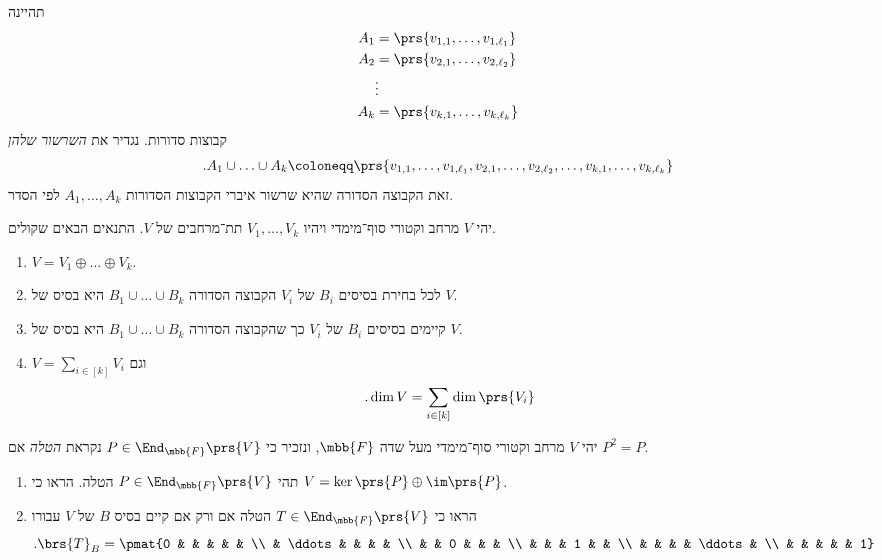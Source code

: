 \documentclass[a4paper,10pt,twoside,openany]{book}
\begin{document}
\begin{definition}
תהיינה
\begin{align*}
A_1 &= \prs{v_{1,1}, \ldots, v_{1, \ell_1}} \\
A_2 &= \prs{v_{2,1}, \ldots, v_{2, \ell_2}} \\
&\vdots \\
A_k &= \prs{v_{k,1}, \ldots, v_{k, \ell_k}}
\end{align*}
קבוצות סדורות.
נגדיר את
\emph{השרשור שלהן}
\begin{align*}
\text{.} A_1 \cup \ldots \cup A_k \coloneqq \prs{v_{1,1}, \ldots, v_{1,\ell_1}, v_{2,1}, \ldots, v_{2,\ell_2}, \ldots, v_{k,1}, \ldots, v_{k,\ell_k}}
\end{align*}
זאת הקבוצה הסדורה שהיא שרשור איברי הקבוצות הסדורות
$A_1, \ldots, A_k$
לפי הסדר.
\end{definition}

\begin{proposition}
יהי
$V$
מרחב וקטורי סוף־מימדי ויהיו
$V_1, \ldots, V_k$
תת־מרחבים של
$V$.
התנאים הבאים שקולים.
\begin{enumerate}
\item $V = V_1 \oplus \ldots \oplus V_k$.
\item לכל בחירת בסיסים
$B_i$
של
$V_i$
הקבוצה הסדורה
$B_1 \cup \ldots \cup B_k$
היא בסיס של
$V$.
\item קיימים בסיסים
$B_i$
של
$V_i$
כך שהקבוצה הסדורה
$B_1 \cup \ldots \cup B_k$
היא בסיס של
$V$.
\item $V = \sum_{i \in [k]} V_i$
וגם
\[\text{.} \dim V = \sum_{i \in [k]} \dim\prs{V_i}\]
\end{enumerate}
\end{proposition}

\newpage

\begin{exercisechap}
יהי
$V$
מרחב וקטורי סוף־מימדי מעל שדה
$\mbb{F}$,
ונזכיר כי
$P \in \End_{\mbb{F}}\prs{V}$
נקראת
\emph{הטלה}
אם
$P^2 = P$.

\begin{enumerate}
\item תהי
$P \in \End_{\mbb{F}}\prs{V}$
הטלה. הראו כי
$V = \ker\prs{P} \oplus \im\prs{P}$.

\item הראו כי
$T \in \End_{\mbb{F}}\prs{V}$
הטלה אם ורק אם קיים בסיס
$B$
של
$V$
עבורו
\[\text{.} \brs{T}_B = \pmat{0 & & & & & \\ & \ddots & & & & \\ & & 0 & & & \\ & & & 1 & & \\ & & & & \ddots & \\ & & & & & 1}\] 
\end{enumerate}
\end{exercisechap}
\end{document}
